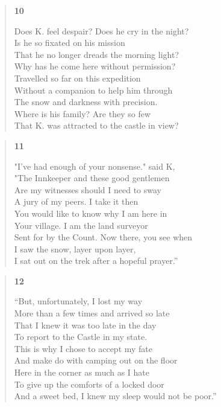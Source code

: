 \documentclass{article}
\begin{document}
\begin{verse}
  \begin{center}
    \textbf{10} \\
  \end{center}
  Does K. feel despair? Does he cry in the night? \\
  Is he so fixated on his mission \\
  That he no longer dreads the morning light? \\
  Why has he come here without permission? \\
  Travelled so far on this expedition \\
  Without a companion to help him through \\
  The snow and darkness with precision. \\
  Where is his family? Are they so few \\
  That K. was attracted to the castle in view?
\end{verse}
\begin{verse}
  \begin{center}
    \textbf{11} \\
  \end{center}
  "I've had enough of your nonsense." said K, \\
  "The Innkeeper and these good gentlemen \\
  Are my witnesses should I need to sway \\
  A jury of my peers. I take it then \\
  You would like to know why I am here in \\
  Your village. I am the land surveyor \\
  Sent for by the Count. Now there, you see when \\
  I saw the snow, layer upon layer, \\
  I sat out on the trek after a hopeful prayer.''
\end{verse}
\newpage
\begin{verse}
  \begin{center}
    \textbf{12} \\
  \end{center}
  ``But, unfortunately, I lost my way \\
  More than a few times and arrived so late \\
  That I knew it was too late in the day \\
  To report to the Castle in my state. \\
  This is why I chose to accept my fate \\
  And make do with camping out on the floor \\
  Here in the corner as much as I hate \\
  To give up the comforts of a locked door \\
  And a sweet bed, I knew my sleep would not be poor.''
\end{verse}
\end{document}
